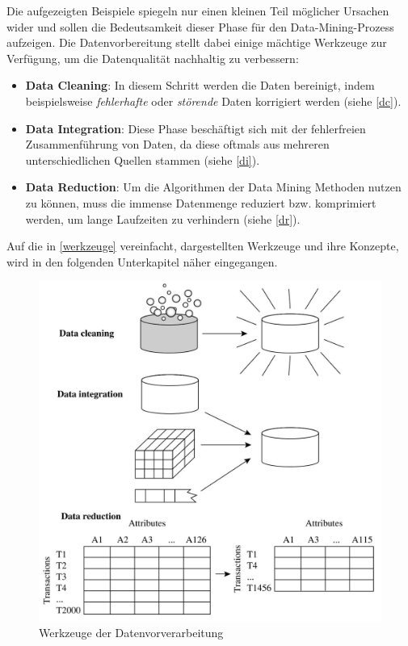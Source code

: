 Die aufgezeigten Beispiele spiegeln nur einen kleinen Teil möglicher Ursachen wider und sollen die Bedeutsamkeit dieser Phase für den Data-Mining-Prozess aufzeigen. Die Datenvorbereitung stellt dabei einige mächtige Werkzeuge zur Verfügung, um die Datenqualität nachhaltig zu verbessern:

\begin{itemize}
\item \textbf{Data Cleaning}: In diesem Schritt werden die Daten bereinigt, indem beispielsweise \textit{fehlerhafte} oder \textit{störende} Daten korrigiert werden (siehe \vref{dc}).

\item \textbf{Data Integration}: Diese Phase beschäftigt sich mit der fehlerfreien Zusammenführung von Daten, da diese oftmals aus mehreren unterschiedlichen Quellen stammen (siehe \vref{di}).

\item \textbf{Data Reduction}: Um die Algorithmen der Data Mining Methoden nutzen zu können, muss die immense Datenmenge reduziert bzw. komprimiert werden, um lange Laufzeiten zu verhindern (siehe \vref{dr}).
\end{itemize}

Auf die in \vref{werkzeuge} vereinfacht, dargestellten Werkzeuge und ihre Konzepte, wird in den folgenden Unterkapitel näher eingegangen.

\begin{figure}[H]
\centering
\includegraphics[scale=1.2]{se-wa-jpg/preprocessing}
\caption[Werkzeuge der Datenvorverarbeitung]{Werkzeuge der Datenvorverarbeitung\protect\footnotemark}
\label{werkzeuge}
\end{figure}


